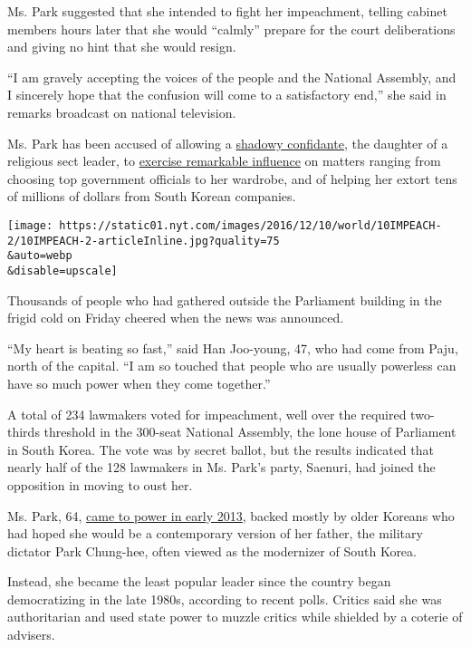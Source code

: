 Ms. Park suggested that she intended to fight her impeachment, telling
cabinet members hours later that she would ``calmly'' prepare for the
court deliberations and giving no hint that she would resign.

``I am gravely accepting the voices of the people and the National
Assembly, and I sincerely hope that the confusion will come to a
satisfactory end,'' she said in remarks broadcast on national
television.

Ms. Park has been accused of allowing a
\href{http://www.nytimes.com/2016/11/06/world/asia/south-koreans-ashamed-over-les-secretive-adviser.html}{shadowy
confidante}, the daughter of a religious sect leader, to
\href{http://www.nytimes.com/2016/10/28/world/asia/south-korea-choi-soon-sil.html}{exercise
remarkable influence} on matters ranging from choosing top government
officials to her wardrobe, and of helping her extort tens of millions of
dollars from South Korean companies.

\texttt{[image: https://static01.nyt.com/images/2016/12/10/world/10IMPEACH-2/10IMPEACH-2-articleInline.jpg?quality=75\\\&auto=webp\\\&disable=upscale]}

Thousands of people who had gathered outside the Parliament building in
the frigid cold on Friday cheered when the news was announced.

``My heart is beating so fast,'' said Han Joo-young, 47, who had come
from Paju, north of the capital. ``I am so touched that people who are
usually powerless can have so much power when they come together.''

A total of 234 lawmakers voted for impeachment, well over the required
two-thirds threshold in the 300-seat National Assembly, the lone house
of Parliament in South Korea. The vote was by secret ballot, but the
results indicated that nearly half of the 128 lawmakers in Ms. Park's
party, Saenuri, had joined the opposition in moving to oust her.

Ms. Park, 64,
\href{http://www.nytimes.com/2013/02/26/world/asia/south-koreas-park-geun-hye-warns-north-against-nuclear-pursuits.html}{came
to power in early 2013}, backed mostly by older Koreans who had hoped
she would be a contemporary version of her father, the military dictator
Park Chung-hee, often viewed as the modernizer of South Korea.

Instead, she became the least popular leader since the country began
democratizing in the late 1980s, according to recent polls. Critics said
she was authoritarian and used state power to muzzle critics while
shielded by a coterie of advisers.


